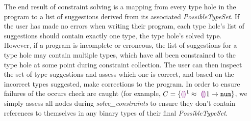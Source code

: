

The end result of constraint solving is a mapping from every type hole in the program to a list of suggestions derived from its associated \textit{PossibleTypeSet}. If the user has made no errors when writing their program, each type hole's list of suggestions should contain exactly one type, the type hole's solved type. However, if a program is incomplete or erroneous, the list of suggestions for a type hole may contain multiple types, which have all been constrained to the type hole at some point during constraint collection. The user can then inspect the set of type suggestions and assess which one is correct, and based on the incorrect types suggested, make corrections to the program. In order to ensure failures of the occurs check are caught (for example, $C = \{ \textcolor{violet}{\llparenthesis}\textcolor{violet}{\rrparenthesis}^{1} \approx~ \textcolor{violet}{\llparenthesis}\textcolor{violet}{\rrparenthesis}{1} \rightarrow \mathtt{num} \}$, we simply assess all nodes during \textit{solve\_constraints} to ensure they don't contain references to themselves in any binary types of their final \textit{PossibleTypeSet}.


